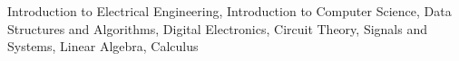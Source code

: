 
\begin{cvparagraph}
    Introduction to Electrical Engineering, Introduction to Computer Science, Data Structures and Algorithms, Digital Electronics, Circuit Theory, Signals and Systems, Linear Algebra, Calculus
\end{cvparagraph}